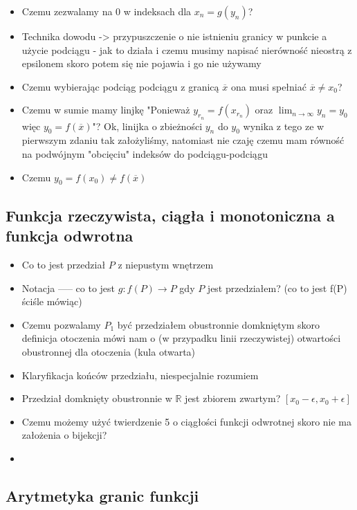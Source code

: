 \documentclass{article}
\begin{document}
\begin{itemize}
    \item Czemu zezwalamy na \(0\) w indeksach dla \(x_n = g(y_n)\)?
    \item Technika dowodu -> przypuszczenie o nie istnieniu granicy w punkcie a użycie podciągu - jak to działa i czemu musimy napisać nierówność nieostrą z epsilonem
    skoro potem się nie pojawia i go nie używamy
    \item Czemu wybierając podciąg podciągu z granicą \(\overline{x}\) ona musi spełniać \(\overline{x} \neq x_0\)?
    \item Czemu w sumie mamy linjkę "Ponieważ \(y_{r_n} = f(x_{r_n})\) oraz \(\lim_{n \to \infty} y_n = y_0\) więc \(y_0 = f(\overline{x})\)"?
    Ok, linijka o zbieżności \(y_n\) do \(y_0\) wynika z tego ze w pierwszym zdaniu tak założyliśmy,
    natomiast nie czaję czemu mam równość na podwójnym "obcięciu" indeksów do podciągu-podciągu
    \item Czemu \(y_0 = f(x_0) \neq f(\overline{x})\)
\end{itemize}

\subsection{Funkcja rzeczywista, ciągła i monotoniczna a funkcja odwrotna}

\begin{itemize}
    \item Co to jest przedział \(P\) z niepustym wnętrzem
    \item Notacja ----- co to jest \(g: f(P) \to P\) gdy \(P\) jest przedziałem? (co to jest f(P) ściśle mówiąc)
    \item Czemu pozwalamy \(P_1\) być przedziałem obustronnie domkniętym skoro definicja otoczenia mówi nam
    o (w przypadku linii rzeczywistej) otwartości obustronnej dla otoczenia (kula otwarta)
    \item Klaryfikacja końców przedziału, niespecjalnie rozumiem
    \item Przedział domknięty obustronnie w \(\mathbb{R}\) jest zbiorem zwartym? \([x_0 - \epsilon, x_0 + \epsilon]\)
    \item Czemu możemy użyć twierdzenie 5 o ciągłości funkcji odwrotnej skoro nie ma założenia o bijekcji?
    \item 
\end{itemize}

\subsection{Arytmetyka granic funkcji}
\end{document}
